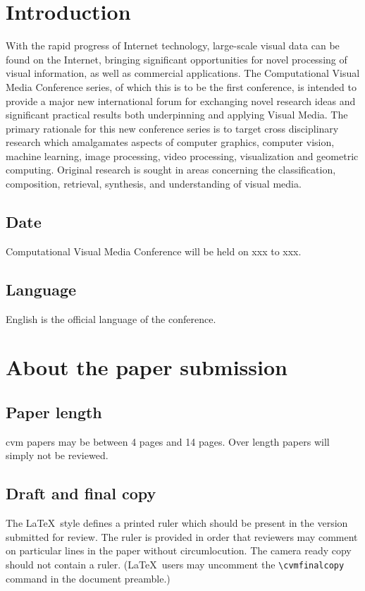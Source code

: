 \documentclass[10pt,twocolumn,letterpaper]{article}
\begin{document}
\section{Introduction}

With the rapid progress of Internet technology, large-scale visual data can be found on the Internet, bringing significant opportunities for novel processing of visual information, as well as commercial applications.
The Computational Visual Media Conference series, of which this is to be the first conference, is intended to provide a major new international forum for exchanging novel research ideas and significant practical results both underpinning and applying Visual Media. The primary rationale for this new conference series is to target cross disciplinary research which amalgamates aspects of computer graphics, computer vision, machine learning, image processing, video processing, visualization and geometric computing. Original research is sought in areas concerning the classification, composition, retrieval, synthesis, and understanding of visual media.

\subsection{Date}
Computational Visual Media Conference will be held on xxx to xxx.

\subsection{Language}
English is the official language of the conference.

\section{About the paper submission}

\subsection{Paper length}
cvm papers may be between 4 pages and 14 pages. Over length papers will simply not be reviewed.

\subsection{Draft and final copy}
The \LaTeX\ style defines a printed ruler which should be present in the
version submitted for review.  The ruler is provided in order that
reviewers may comment on particular lines in the paper without
circumlocution. The camera ready copy should not contain a ruler.
(\LaTeX\ users may uncomment the \verb'\cvmfinalcopy' command in the document preamble.)
\end{document}
